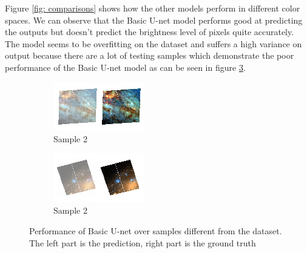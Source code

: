 \documentclass[oneside,a4paper,12pt]{report}
\begin{document}
Figure \ref{fig: comparisons} shows how the other models perform in different color spaces. We can observe that the Basic U-net model performs good at predicting the outputs but doesn't predict the brightness level of pixels quite accurately. The model seems to be overfitting on the dataset and suffers a high variance on output because there are a lot of testing samples which demonstrate the poor performance of the Basic U-net model as can be seen in figure \ref{fig: u-net_overfit}.

\begin{figure}[!htb]
	\centering
	\begin{subfigure}[b]{0.4\textwidth}
		\centering
		\includegraphics[width=\textwidth]{figures/overfit_1}
		\caption{Sample 2}
		\label{fig: overfit1}
	\end{subfigure}
		\hspace{0.1 in}
	\begin{subfigure}[b]{0.4\textwidth}
		\centering
		\includegraphics[width=\textwidth]{figures/overfit_2}
		\caption{Sample 2}
		\label{fig: overfit2}
	\end{subfigure}
	\caption{Performance of Basic U-net over samples different from the dataset. The left part is the prediction, right part is the ground truth}
	\label{fig: u-net_overfit}
\end{figure}
\end{document}
